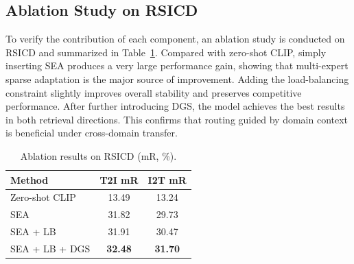 \documentclass[conference]{IEEEtran}
\begin{document}
\begin{table}[t]
\caption{Main retrieval results on RSICD (\%).}
\label{tab:main_results}
\centering
\footnotesize
{}
\end{table}

\subsection{Ablation Study on RSICD}
To verify the contribution of each component, an ablation study is conducted on RSICD and summarized in Table~\ref{tab:ablation}. Compared with zero-shot CLIP, simply inserting SEA produces a very large performance gain, showing that multi-expert sparse adaptation is the major source of improvement. Adding the load-balancing constraint slightly improves overall stability and preserves competitive performance. After further introducing DGS, the model achieves the best results in both retrieval directions. This confirms that routing guided by domain context is beneficial under cross-domain transfer.

\begin{table}[t]
\caption{Ablation results on RSICD (mR, \%).}
\label{tab:ablation}
\centering
\footnotesize
\begin{tabular}{lcc}
\toprule
Method & T2I mR & I2T mR \\
\midrule
Zero-shot CLIP & 13.49 & 13.24 \\
SEA & 31.82 & 29.73 \\
SEA + LB & 31.91 & 30.47 \\
SEA + LB + DGS & \textbf{32.48} & \textbf{31.70} \\
\bottomrule
\end{tabular}
\end{table}
\end{document}
